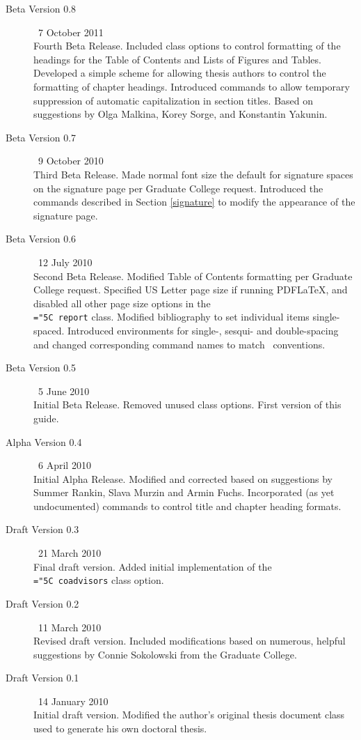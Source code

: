 \documentclass[11pt]{article}
\newcommand\code[1]{{\normalfont\texttt{\let\dv\textsl\chardef\\="5C #1}}}
\begin{document}
\begin{description}
\item[Beta Version 0.8] \dotfill\ 7 October 2011\\
Fourth Beta Release.  Included class options to control formatting of the headings for the Table of Contents and Lists of Figures and Tables.  Developed a simple scheme for allowing thesis authors to control the formatting of chapter headings.  Introduced commands to allow temporary suppression of automatic capitalization in section titles.  Based on suggestions by Olga Malkina, Korey Sorge, and Konstantin Yakunin.

\item[Beta Version 0.7] \dotfill\ 9 October 2010\\
Third Beta Release.  Made normal font size the default for signature spaces on the signature page per Graduate College request.  Introduced the commands described in Section \ref{signature} to modify the appearance of the signature page.

\item[Beta Version 0.6] \dotfill\ 12 July 2010\\
Second Beta Release.  Modified Table of Contents formatting per Graduate College request.  Specified US Letter page size if running PDF\LaTeX, and disabled all other page size options in the \LaTeXe\ \code{report} class.  Modified bibliography to set individual items single-spaced.  Introduced environments for single-, sesqui- and double-spacing and changed corresponding command names to match \LaTeXe\ conventions.

\item[Beta Version 0.5] \dotfill\ 5 June 2010\\
Initial Beta Release.  Removed unused class options.  First version of this guide.

\item[Alpha Version 0.4] \dotfill\ 6 April 2010\\
Initial Alpha Release.  Modified and corrected based on suggestions by Summer Rankin, Slava Murzin and Armin Fuchs.  Incorporated (as yet undocumented) commands to control title and chapter heading formats.

\item[Draft Version 0.3] \dotfill\ 21 March 2010\\
Final draft version.  Added initial implementation of the \code{coadvisors} class option.

\item[Draft Version 0.2] \dotfill\ 11 March 2010\\
Revised draft version.  Included modifications based on numerous, helpful suggestions by Connie Sokolowski from the Graduate College.

\item[Draft Version 0.1] \dotfill\ 14 January 2010\\
Initial draft version.  Modified the author's original thesis document class used to generate his own doctoral thesis.
\end{description}
\end{document}
